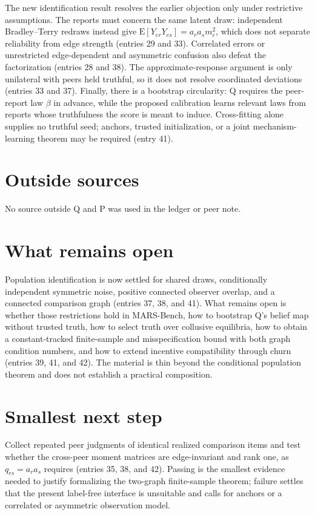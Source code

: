 \documentclass{article}
\begin{document}
The new identification result resolves the earlier objection only under restrictive assumptions.  The reports must concern the same latent draw: independent Bradley--Terry redraws instead give $\mathrm{E}[Y_{er}Y_{es}]=a_ra_sm_e^2$, which does not separate reliability from edge strength (entries 29 and 33).  Correlated errors or unrestricted edge-dependent and asymmetric confusion also defeat the factorization (entries 28 and 38).  The approximate-response argument is only unilateral with peers held truthful, so it does not resolve coordinated deviations (entries 33 and 37).  Finally, there is a bootstrap circularity: Q requires the peer-report law $\beta$ in advance, while the proposed calibration learns relevant laws from reports whose truthfulness the score is meant to induce.  Cross-fitting alone supplies no truthful seed; anchors, trusted initialization, or a joint mechanism-learning theorem may be required (entry 41).

\section*{Outside sources}
No source outside Q and P was used in the ledger or peer note.

\section*{What remains open}
Population identification is now settled for shared draws, conditionally independent symmetric noise, positive connected observer overlap, and a connected comparison graph (entries 37, 38, and 41).  What remains open is whether those restrictions hold in MARS-Bench, how to bootstrap Q's belief map without trusted truth, how to select truth over collusive equilibria, how to obtain a constant-tracked finite-sample and misspecification bound with both graph condition numbers, and how to extend incentive compatibility through churn (entries 39, 41, and 42).  The material is thin beyond the conditional population theorem and does not establish a practical composition.

\section*{Smallest next step}
Collect repeated peer judgments of identical realized comparison items and test whether the cross-peer moment matrices are edge-invariant and rank one, as $q_{rs}=a_ra_s$ requires (entries 35, 38, and 42).  Passing is the smallest evidence needed to justify formalizing the two-graph finite-sample theorem; failure settles that the present label-free interface is unsuitable and calls for anchors or a correlated or asymmetric observation model.
\end{document}
